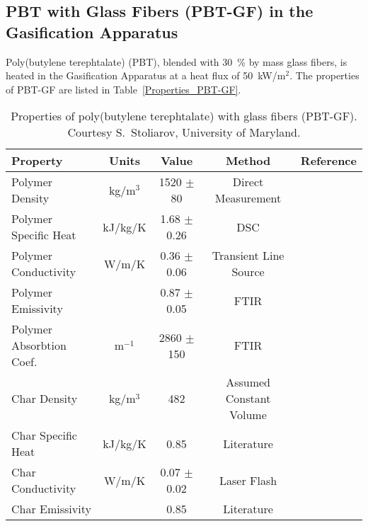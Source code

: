 \clearpage


\subsection{PBT with Glass Fibers (PBT-GF) in the Gasification Apparatus}

Poly(butylene terephtalate) (PBT), blended with 30~\% by mass glass fibers, is heated in the Gasification Apparatus at a heat flux of
50~kW/m$^2$. The properties of PBT-GF are listed in Table~\ref{Properties_PBT-GF}.

\begin{table}[h!]
\caption[Properties of poly(butylene terephtalate) with glass fibers (PBT-GF).]{Properties of poly(butylene terephtalate) with glass fibers (PBT-GF).
Courtesy S.~Stoliarov, University of Maryland.}
\begin{center}
\begin{tabular}{|l|c|c|c|c|}
\hline
Property                &      Units    &      Value                        & Method                    & Reference         \\ \hline \hline
Polymer Density         &     kg/m$^3$  &  1520 $\pm$ 80                    & Direct Measurement        & \cite{Kempel:1}   \\ \hline
Polymer Specific Heat   &    kJ/kg/K    & 1.68 $\pm$ 0.26                   & DSC                       & \cite{Kempel:1}   \\ \hline
Polymer Conductivity    &      W/m/K    & 0.36 $\pm$ 0.06                   & Transient Line Source     & \cite{Kempel:1}   \\ \hline
Polymer Emissivity      &               & 0.87 $\pm$ 0.05                   & FTIR                      & \cite{Linteris:2} \\ \hline
Polymer Absorbtion Coef.&  m$^{-1}$     & 2860 $\pm$ 150                    & FTIR                      & \cite{Linteris:2} \\ \hline
Char Density            &     kg/m$^3$  &        482                        & Assumed Constant Volume   & \cite{Kempel:1}   \\ \hline
Char Specific Heat      &    kJ/kg/K    &        0.85                       & Literature                & \cite{SCHOTT}     \\ \hline
Char Conductivity       &      W/m/K    & 0.07 $\pm$ 0.02                   & Laser Flash               & \cite{Kempel:1}   \\ \hline
Char Emissivity         &               &       0.85                        & Literature                & \cite{Braeuer:1}  \\ \hline

\end{tabular}
\end{center}
\end{table}
